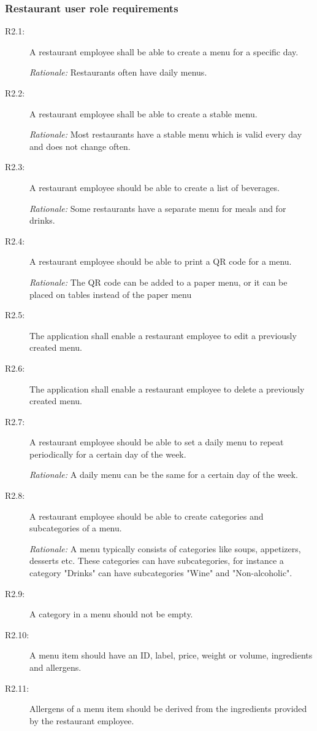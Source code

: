 \subsubsection{Restaurant user role requirements}
\begin{description}
    \item [R2.1:] A restaurant employee shall be able to create a menu for a specific day.

    \emph{Rationale:} Restaurants often have daily menus.
    \item [R2.2:] A restaurant employee shall be able to create a stable menu.

    \emph{Rationale:} Most restaurants have a stable menu which is valid every day and does not change often.
    \item [R2.3:] A restaurant employee should be able to create a list of beverages.

    \emph{Rationale:} Some restaurants have a separate menu for meals and for drinks.
    \item [R2.4:] A restaurant employee should be able to print a QR code for a menu.

    \emph{Rationale:} The QR code can be added to a paper menu, or it can be placed on tables instead of the paper menu
   
    \item [R2.5:] The application shall enable a restaurant employee to edit a previously created menu.
    \item [R2.6:] The application shall enable a restaurant employee to delete a previously created menu.
    \item [R2.7:] A restaurant employee should be able to set a daily menu to repeat periodically for a certain day of the week.

    \emph{Rationale:} A daily menu can be the same for a certain day of the week.
    \item [R2.8:] A restaurant employee should be able to create categories and subcategories of a menu.

    \emph{Rationale:} A menu typically consists of categories like soups, appetizers, desserts etc. These categories can have subcategories, for instance a category "Drinks" can have subcategories "Wine" and "Non-alcoholic".
    \item [R2.9:] A category in a menu should not be empty.   
    \item [R2.10:] A menu item should have an ID, label, price, weight or volume, ingredients and allergens.
    \item [R2.11:] Allergens of a menu item should be derived from the ingredients provided by the restaurant employee.


\end{description}
